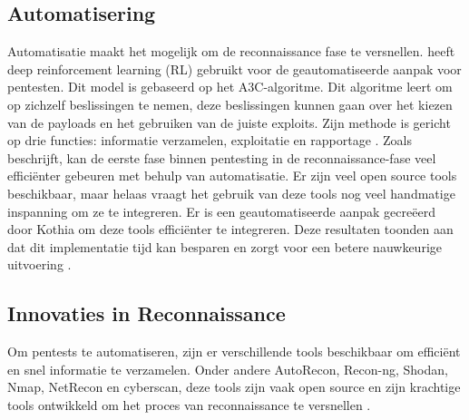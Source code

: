 \subsection{Automatisering}
Automatisatie maakt het mogelijk om de reconnaissance fase te versnellen. 
\textcite{Hoang} heeft deep reinforcement learning (RL) gebruikt voor de geautomatiseerde aanpak voor pentesten. 
Dit model is gebaseerd op het A3C-algoritme. Dit algoritme leert om op zichzelf beslissingen te nemen, deze beslissingen kunnen gaan over het kiezen van de payloads en het gebruiken van de juiste exploits. 
Zijn methode is gericht op drie functies: informatie verzamelen, exploitatie en rapportage \autocite{Hoang}.
Zoals \textcite{Kothia} beschrijft, kan de eerste fase binnen pentesting in de reconnaissance-fase veel efficiënter gebeuren met behulp van automatisatie. 
Er zijn veel open source tools beschikbaar, maar helaas vraagt het gebruik van deze tools nog veel handmatige inspanning om ze te integreren.
Er is een geautomatiseerde aanpak gecreëerd door Kothia om deze tools efficiënter te integreren. 
Deze resultaten toonden aan dat dit implementatie tijd kan besparen en zorgt voor een betere nauwkeurige uitvoering \parencite{Kothia}.

\subsection{Innovaties in Reconnaissance}
Om pentests te automatiseren, zijn er verschillende tools beschikbaar om efficiënt en snel informatie te verzamelen. 
Onder andere AutoRecon, Recon-ng, Shodan, Nmap, NetRecon en cyberscan, deze tools zijn vaak open source en zijn krachtige tools ontwikkeld om het proces van reconnaissance te versnellen \autocite{Shebli} .


